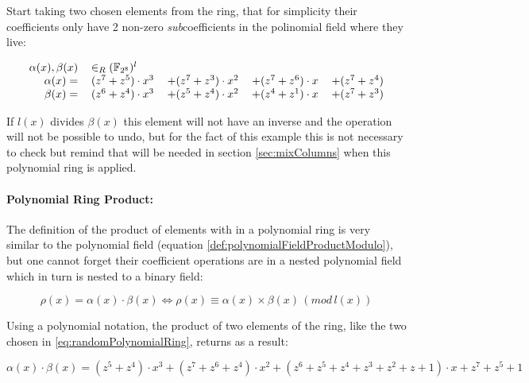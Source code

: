 \documentclass[10pt,a4paper,twoside]{llncs}
\newcommand{\fixme}[1]{\texttt{\color{red}FIXME:} ``\emph{#1}''}
\newcommand{\Fpn}[2]{\ensuremath{\mathbb{F}_{#1^#2}}}
\begin{document}
Start taking two chosen elements from the ring, that for simplicity their coefficients only have 2 non-zero \emph{sub}coefficients in the polinomial field where they live:

\begin{equation}\label{eq:randomPolynomialRing}
 \begin{tabular}{rllll}
  $\alpha(x),\beta(x)$&$ \in_R (\Fpn{2}{8})^l$&&\\
  $\alpha(x)=$&$(z^7+z^5)\cdot x^3$&$+(z^7+z^3)\cdot x^2$&$+(z^7+z^6)\cdot x$&$+(z^7+z^4)$\\
  $\beta(x)=$ &$(z^6+z^4)\cdot x^3$&$+(z^5+z^4)\cdot x^2$&$+(z^4+z^1)\cdot x$&$+(z^7+z^3)$\\
 \end{tabular}
\end{equation}

If $l(x)$ divides $\beta(x)$ this element will not have an inverse and the operation will not be possible to undo, but for the fact of this example this is not necessary to check but remind that will be needed in section \ref{sec:mixColumns} when this polynomial ring is applied. 

\paragraph*{Polynomial Ring Product:}

The definition of the product of elements with in a polynomial ring is very similar to the polynomial field (equation \ref{def:polynomialFieldProductModulo}), but one cannot forget their coefficient operations are in a nested polynomial field which in turn is nested to a binary field:

\begin{equation}\label{def:polynomialRingProductModulo}
 \rho(x)=\alpha(x)\cdot \beta(x) \Leftrightarrow \rho(x) \equiv \alpha(x) \times \beta(x) \, (mod\,l(x))
\end{equation}

Using a polynomial notation, the product of two elements of the ring, like the two chosen in \ref{eq:randomPolynomialRing}, returns as a result:

\begin{equation}
 \alpha(x)\cdot \beta(x)=(z^5 + z^4)\cdot x^3 + (z^7 + z^6 + z^4)\cdot x^2 + (z^6 + z^5 + z^4 + z^3 + z^2 +
z + 1)\cdot x + z^7 + z^5 + 1
\end{equation}

\end{document}
